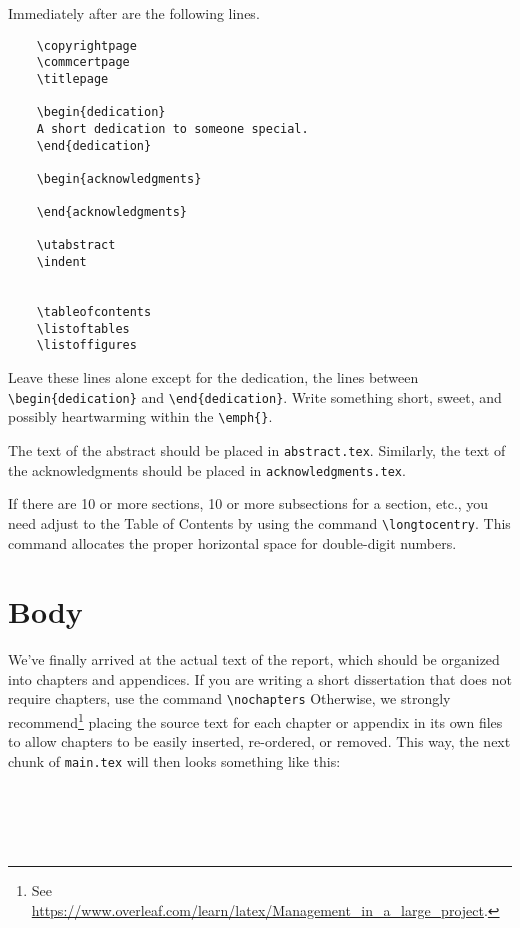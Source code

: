 Immediately after \verb++ are the following lines.
\begin{verbatim}
    \copyrightpage
    \commcertpage
    \titlepage

    \begin{dedication}
    A short dedication to someone special.
    \end{dedication}

    \begin{acknowledgments}
    
    \end{acknowledgments}

    \utabstract
    \indent
    

    \tableofcontents
    \listoftables
    \listoffigures
\end{verbatim}
Leave these lines alone except for the dedication, the lines between \verb+\begin{dedication}+ and \verb+\end{dedication}+.
Write something short, sweet, and possibly heartwarming within the \verb+\emph{}+.

The text of the abstract should be placed in \texttt{abstract.tex}.
Similarly, the text of the acknowledgments should be placed in \texttt{acknowledgments.tex}.

If there are 10 or more sections, 10 or more subsections for a section,
etc., you need adjust to the Table of Contents by using the
command \verb+\longtocentry+.
%
This command allocates the proper horizontal space for double-digit
numbers.

\section{Body} %

We've finally arrived at the actual text of the report, which should be organized into chapters and appendices.
If you are writing a short dissertation
that does not require chapters, use the command \verb+\nochapters+
%
Otherwise, we strongly recommend\footnote{See \url{https://www.overleaf.com/learn/latex/Management_in_a_large_project}.} placing the source text for each chapter or appendix in its own files to allow chapters to be easily inserted, re-ordered, or removed.
This way, the next chunk of \texttt{main.tex} will then looks something like this:
\begin{verbatim}
    
    
    
    
\end{verbatim}
%

